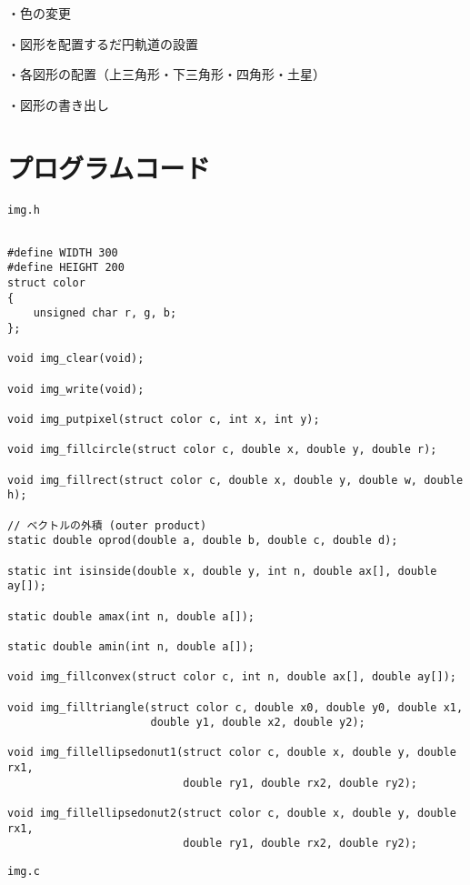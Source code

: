\documentclass[12pt,a4j]{jarticle}
\begin{document}
・色の変更

・図形を配置するだ円軌道の設置

・各図形の配置（上三角形・下三角形・四角形・土星）

・図形の書き出し

\section{プログラムコード}

\verb|img.h|

\begin{verbatim}

#define WIDTH 300
#define HEIGHT 200
struct color
{
    unsigned char r, g, b;
};

void img_clear(void);

void img_write(void);

void img_putpixel(struct color c, int x, int y);

void img_fillcircle(struct color c, double x, double y, double r);

void img_fillrect(struct color c, double x, double y, double w, double h);

// ベクトルの外積 (outer product)
static double oprod(double a, double b, double c, double d);

static int isinside(double x, double y, int n, double ax[], double ay[]);

static double amax(int n, double a[]);

static double amin(int n, double a[]);

void img_fillconvex(struct color c, int n, double ax[], double ay[]);

void img_filltriangle(struct color c, double x0, double y0, double x1, 
                      double y1, double x2, double y2);

void img_fillellipsedonut1(struct color c, double x, double y, double rx1, 
                           double ry1, double rx2, double ry2);

void img_fillellipsedonut2(struct color c, double x, double y, double rx1, 
                           double ry1, double rx2, double ry2);

\end{verbatim}

\verb|img.c|
\end{document}
